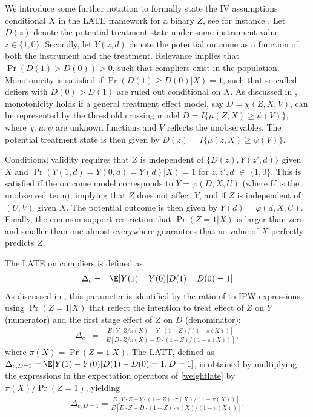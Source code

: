 \documentclass[nojss]{jss}
\begin{document}
We introduce some further notation to formally state the IV assumptions conditional $X$ in the LATE framework for a binary $Z$, see for instance \citet{Abadie00}. Let $D(z)$ denote the potential treatment state under some instrument value $z \in \{1,0\}$. Secondly, let $Y(z,d)$ denote the potential outcome as a function of both the instrument and the treatment. Relevance implies that  $\Pr(D(1)> D(0))>0$, such that compliers exist in the population. Monotonicity is satisfied if $\Pr(D(1)\geq D(0)|X)=1$, such that so-called defiers with $D(0)>D(1)$ are ruled out conditional on $X$. As discussed in \citet{Vy02}, monotonicity holds if a general treatment effect model, say $D=\chi (Z,X,V)$, can be represented by the threshold crossing model $D=I\{\mu(Z,X)\geq \psi(V)\}$, where $\chi,\mu,\psi$ are unknown functions and $V$ reflects the unobservables. The potential treatment state is then given by $D(z)=I\{\mu(z,X)\geq \psi(V)\}$.

Conditional validity requires that $Z$ is independent of $\{D(z), Y(z',d)\}$ given $X$ and $\Pr(Y(1,d)=Y(0,d)=Y(d)|X)=1$ for $z,z',d$ $\in$ $\{1,0\}$. This is satisfied if the outcome model corresponds to $Y=\varphi(D,X,U)$ (where $U$ is the unobserved term), implying that $Z$ does not affect $Y$, and if $Z$ is independent of $(U,V)$ given $X$. The potential outcome is then given by $Y(d)=\varphi(d,X,U)$. Finally, the common support restriction that $\Pr(Z=1|X)$ is larger than zero and smaller than one almost everywhere guarantees that no value of $X$ perfectly predicts $Z$.

The LATE on compliers is defined as
\begin{eqnarray}
\Delta_c &=&\E[Y(1)-Y(0)|D(1)-D(0)=1]
\end{eqnarray}
As discussed in \citet{Fr07}, this parameter is identified by the ratio of to IPW expressions using $\Pr(Z=1|X)$ that reflect the intention to treat effect of $Z$ on  $Y$ (numerator) and the first stage effect of $Z$ on $D$ (denominator):
\begin{eqnarray}\label{weightlate}
\Delta_c&=&\frac{E[Y\cdot Z/\pi(X)-Y\cdot(1-Z)/(1-\pi(X))]}{E[D\cdot Z/\pi(X)-D\cdot(1-Z)/(1-\pi(X))]},
\end{eqnarray}
where $\pi(X)=\Pr(Z=1|X)$. The LATT, defined as $\Delta_{c,D=1} =\E[Y(1)-Y(0)|D(1)-D(0)=1,D=1]$, is obtained by multiplying the expressions in the expectation operators of \eqref{weightlate} by $\pi(X)/\Pr(Z=1)$, yielding
\begin{eqnarray}
\Delta_{c,D=1}=\frac{E[Y\cdot Z-Y\cdot(1-Z)\cdot\pi(X)/(1-\pi(X))]}{E[D\cdot Z-D\cdot(1-Z)\cdot\pi(X)/(1-\pi(X))]}.\label{latt}
\end{eqnarray}
\end{document}
